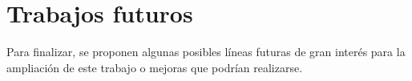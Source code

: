 %
%
%
%
%
%
\section{Trabajos futuros}

Para finalizar, se proponen algunas posibles líneas futuras de gran interés para la ampliación de este trabajo o mejoras que podrían realizarse.

